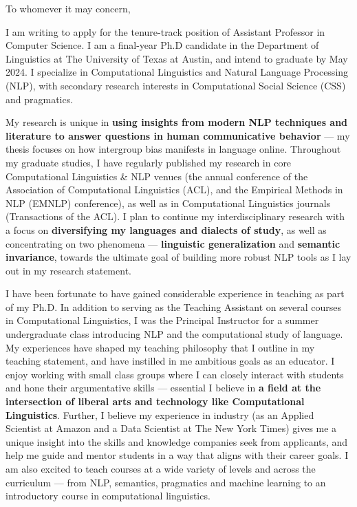 \documentclass[11pt, letterpaper]{practical-letter}
\begin{document}
\senderbox

\opening{To whomever it may concern,}

I am writing to apply for the tenure-track position of Assistant Professor in Computer Science. I am a final-year Ph.D candidate in the Department of Linguistics at The University of Texas at Austin, and intend to graduate by May 2024. I specialize in Computational Linguistics and Natural Language Processing (NLP), with secondary research interests in Computational Social Science (CSS) and pragmatics.

My research is unique in \textbf{using insights from modern NLP techniques and literature to answer questions in human communicative behavior} --- my thesis focuses on how intergroup bias manifests in language online. Throughout my graduate studies, I have regularly published my research in core Computational Linguistics \& NLP venues (the annual conference of the Association of Computational Linguistics (ACL), and the Empirical Methods in NLP (EMNLP) conference), as well as in Computational Linguistics journals (Transactions of the ACL). I plan to continue my interdisciplinary research with a focus on \textbf{diversifying my languages and dialects of study}, as well as concentrating on two phenomena --- \textbf{linguistic generalization} and \textbf{semantic invariance}, towards the ultimate goal of building more robust NLP tools as I lay out in my research statement. 

I have been fortunate to have gained considerable experience in teaching as part of my Ph.D. In addition to serving as the Teaching Assistant on several courses in Computational Linguistics, I was the Principal Instructor for a summer undergraduate class introducing NLP and the computational study of language. My experiences have shaped my teaching philosophy that I outline in my teaching statement, and have instilled in me ambitious goals as an educator. I enjoy working with small class groups where I can closely interact with students and hone their argumentative skills --- essential I believe in \textbf{a field at the intersection of liberal arts and technology like Computational Linguistics}. Further, I believe my experience in industry (as an Applied Scientist at Amazon and a Data Scientist at The New York Times) gives me a unique insight into the skills and knowledge companies seek from applicants, and help me guide and mentor students in a way that aligns with their career goals. I am also excited to teach courses at a wide variety of levels and across the curriculum --- from NLP, semantics, pragmatics and machine learning to an introductory course in computational linguistics.
\end{document}
